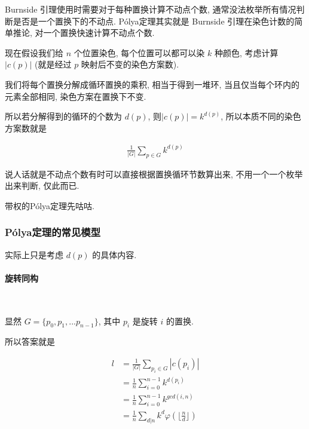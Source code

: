 \documentclass{ctexart}
\begin{document}
Burnside 引理使用时需要对于每种置换计算不动点个数, 通常没法枚举所有情况判断是否是一个置换下的不动点. 
Pólya定理其实就是 Burnside 引理在染色计数的简单推论, 对一个置换快速计算不动点个数.

现在假设我们给 $n$ 个位置染色, 每个位置可以都可以染 $k$ 种颜色, 考虑计算 $|c(p)|$ (就是经过 $p$ 映射后不变的染色方案数).

我们将每个置换分解成循环置换的乘积, 相当于得到一堆环, 当且仅当每个环内的元素全部相同, 染色方案在置换下不变.

所以若分解得到的循环的个数为 $d(p)$, 则$|c(p)|=k^{d(p)}$, 所以本质不同的染色方案数就是

\begin{align*}
    \frac{1}{|G|}\sum_{p \in G}k^{d(p)}
\end{align*}

说人话就是不动点个数有时可以直接根据置换循环节数算出来, 不用一个一个枚举出来判断, 仅此而已.

带权的Pólya定理先咕咕.



\subsubsection{Pólya定理的常见模型}
实际上只是考虑 $d(p)$ 的具体内容.
\paragraph{旋转同构}\ 

显然 $G = \{p_0, p_1,...p_{n-1}\}$, 其中 $p_i$ 是旋转 $i$ 的置换.

所以答案就是

\begin{align*}
    l &= \frac{1}{|G|}\sum_{p_i \in G} |c(p_i)| \\
      &= \frac{1}{n} \sum_{i=0}^{n-1} k^{d(p_i)}\\
      &= \frac{1}{n} \sum_{i=0}^{n-1} k^{gcd(i,n)}\\
      &= \frac{1}{n} \sum_{d|n}k^d \varphi(\lfloor \frac{n}{d}\rfloor)
\end{align*}
\end{document}
